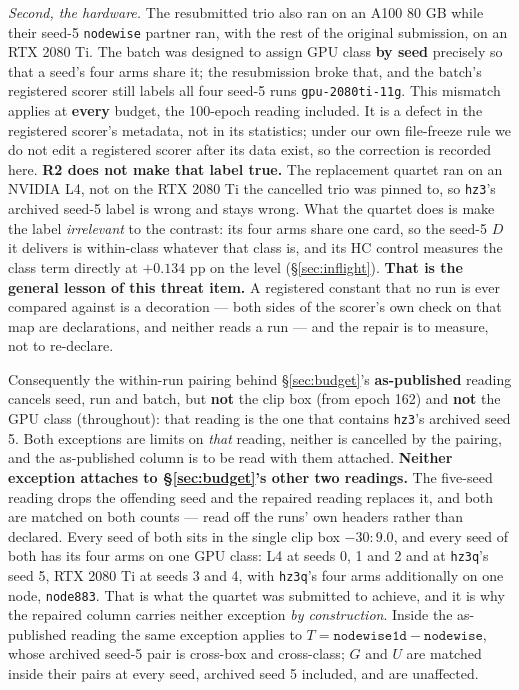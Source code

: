 \documentclass[10pt,letterpaper]{article}
\newcommand{\Dstat}{D}                         %
\newcommand{\Gstat}{G}                         %
\newcommand{\Tstat}{T}                         %
\newcommand{\Ustat}{U}                         %
\newcommand{\arm}[1]{\texttt{#1}}
\begin{document}
\emph{Second, the hardware.} The resubmitted trio also ran on an A100 80 GB while their seed-5
\arm{nodewise} partner ran, with the rest of the original submission, on an RTX 2080 Ti. The batch
was designed to assign GPU class \textbf{by seed} precisely so that a seed's four arms share it;
the resubmission broke that, and the batch's registered scorer still labels all four seed-5 runs
\texttt{gpu-2080ti-11g}. This mismatch applies at \textbf{every} budget, the 100-epoch reading
included. It is a defect in the registered scorer's metadata, not in its statistics; under our own
file-freeze rule we do not edit a registered scorer after its data exist, so the correction is
recorded here. \textbf{R2 does not make that label true.} The replacement quartet ran on an NVIDIA
L4, not on the RTX 2080 Ti the cancelled trio was pinned to, so \arm{hz3}'s archived seed-5 label
is wrong and stays wrong. What the quartet does is make the label \emph{irrelevant} to the
contrast: its four arms share one card, so the seed-5 $\Dstat$ it delivers is within-class whatever
that class is, and its HC control measures the class term directly at $+0.134$ pp on the level
(\S\ref{sec:inflight}). \textbf{That is the general lesson of this threat item.} A registered
constant that no run is ever compared against is a decoration --- both sides of the scorer's own
check on that map are declarations, and neither reads a run --- and the repair is to measure, not
to re-declare.

Consequently the within-run pairing behind \S\ref{sec:budget}'s \textbf{as-published} reading
cancels seed, run and batch, but \textbf{not} the clip box (from epoch 162) and \textbf{not} the
GPU class (throughout): that reading is the one that contains \arm{hz3}'s archived seed 5. Both
exceptions are limits on \emph{that} reading, neither is cancelled by the pairing, and the
as-published column is to be read with them attached. \textbf{Neither exception attaches to
\S\ref{sec:budget}'s other two readings.} The five-seed reading drops the offending seed and the
repaired reading replaces it, and both are matched on both counts --- read off the runs' own
headers rather than declared. Every seed of both sits in the single clip box $-30{:}9.0$, and every
seed of both has its four arms on one GPU class: L4 at seeds 0, 1 and 2 and at \arm{hz3q}'s seed 5,
RTX 2080 Ti at seeds 3 and 4, with \arm{hz3q}'s four arms additionally on one node,
\texttt{node883}. That is what the quartet was submitted to achieve, and it is why the repaired
column carries neither exception \emph{by construction}.
Inside the as-published reading the same exception applies to
$\Tstat = \arm{nodewise1d} - \arm{nodewise}$, whose archived seed-5 pair is cross-box and
cross-class; $\Gstat$ and $\Ustat$ are matched inside their pairs at every seed, archived seed 5
included, and are unaffected.
\end{document}
